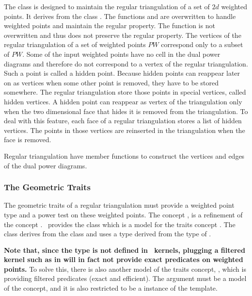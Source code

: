 The class 
 is designed to maintain the
regular triangulation of a set of $2d$ weighted points.
It derives from the class .
The functions  and 
 are overwritten to handle weighted points
and maintain the regular
property.
The function  is not 
overwritten and thus does not preserve the regular property.
The vertices of the regular triangulation
of a set of weighted points ${PW}$ correspond  only to a subset
of ${PW}$.
Some of the input
weighted points have no cell in the dual power diagrams
and therefore do not correspond to a vertex of the regular
triangulation.
Such a point is called a hidden point.
Because hidden points can reappear later on as vertices
when  some other point is removed,
they  have to be stored somewhere. 
The regular triangulation  store those points in special vertices, called
hidden vertices. 
A hidden point can reappear as vertex of the triangulation
only when the two dimensional face that hides it
is removed from the triangulation. To deal with this feature,
each face of a regular triangulation stores a list of hidden vertices.
The points in those vertices 
are reinserted in the triangulation  when the face
is removed.

Regular triangulation have member functions to construct
the vertices and edges of the dual power diagrams.

\subsubsection{The Geometric Traits}
The geometric traits of a regular triangulation
must provide a weighted point type
and a power test on these weighted points.
The concept 
,
is a refinement of the concept
. \cgal\ provides 
the class
which is a model for the traits concept
.
The class 
derives  from the class
and uses a  type
derived from the type  of
.

\textbf{Note that, since the type  is not defined 
in \cgal\ kernels, plugging a filtered kernel  such as 
 in
 will in fact
not provide exact predicates on  weighted points.}
To solve this, there is also another model of the traits concept,
, which is providing filtered
predicates (exact and efficient). The argument  must be a
model of the  concept, and it is also restricted to be a
instance of the  template. 



